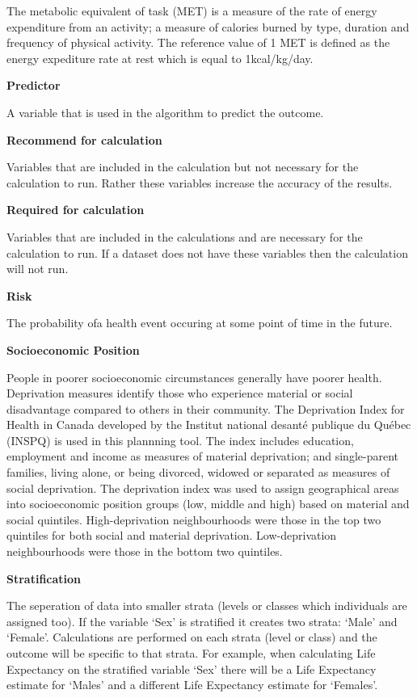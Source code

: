\documentclass[]{book}
\begin{document}
The metabolic equivalent of task (MET) is a measure of the rate of
energy expenditure from an activity; a measure of calories burned by
type, duration and frequency of physical activity. The reference value
of 1 MET is defined as the energy expediture rate at rest which is equal
to 1kcal/kg/day.

\textbf{Predictor}

A variable that is used in the algorithm to predict the outcome.

\textbf{Recommend for calculation}

Variables that are included in the calculation but not necessary for the
calculation to run. Rather these variables increase the accuracy of the
results.

\textbf{Required for calculation}

Variables that are included in the calculations and are necessary for
the calculation to run. If a dataset does not have these variables then
the calculation will not run.

\textbf{Risk}

The probability ofa health event occuring at some point of time in the
future.

\textbf{Socioeconomic Position}

People in poorer socioeconomic circumstances generally have poorer
health. Deprivation measures identify those who experience material or
social disadvantage compared to others in their community. The
Deprivation Index for Health in Canada developed by the Institut
national desanté publique du Québec (INSPQ)\citep{INSPQ2000} is used in
this plannning tool. The index includes education, employment and income
as measures of material deprivation; and single-parent families, living
alone, or being divorced, widowed or separated as measures of social
deprivation. The deprivation index was used to assign geographical areas
into socioeconomic position groups (low, middle and high) based on
material and social quintiles. High-deprivation neighbourhoods were
those in the top two quintiles for both social and material deprivation.
Low-deprivation neighbourhoods were those in the bottom two quintiles.

\textbf{Stratification}

The seperation of data into smaller strata (levels or
classes which individuals are assigned too). If the variable `Sex' is
stratified it creates two strata: `Male' and `Female'. Calculations are
performed on each strata (level or class) and the outcome will be
specific to that strata. For example, when calculating Life Expectancy
on the stratified variable `Sex' there will be a Life Expectancy
estimate for `Males' and a different Life Expectancy estimate for
`Females'.
\end{document}

